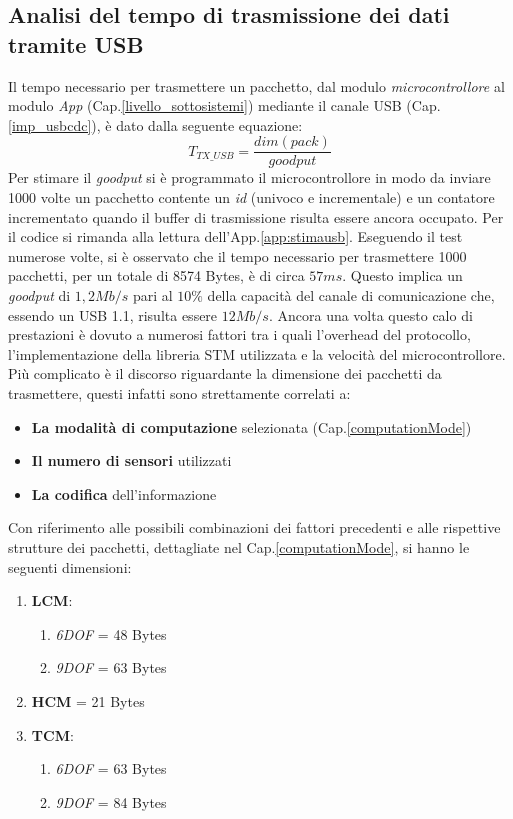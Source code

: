 \subsection{Analisi del tempo di trasmissione dei dati tramite USB}
\label{analisiusb}
Il tempo necessario per trasmettere un pacchetto, dal modulo \textit{microcontrollore} al modulo \textit{App} (Cap.\ref{livello_sottosistemi}) mediante il canale USB (Cap.\ref{imp_usbcdc}), è dato dalla seguente equazione:
\begin{equation}
\label{tx_usb}
T_{TX\_USB}=  \frac{dim(pack)}{goodput}
\end{equation}
Per stimare il \textit{goodput} si è programmato il microcontrollore in modo da inviare 1000 volte un pacchetto contente un \textit{id} (univoco e incrementale) e un contatore incrementato quando il buffer di trasmissione risulta essere ancora occupato. Per il codice si rimanda alla lettura dell'App.\ref{app:stimausb}.
Eseguendo il test numerose volte, si è osservato che il tempo necessario per trasmettere 1000 pacchetti, per un totale di 8574 Bytes, è di circa $57 ms$. 
Questo implica un \textit{goodput} di $1,2 Mb/s$ pari al $10\%$ della capacità del canale di comunicazione che, essendo un USB 1.1, risulta essere $12 Mb/s$. Ancora una volta questo calo di prestazioni è dovuto a numerosi fattori tra i quali l'overhead del protocollo, l'implementazione della libreria STM utilizzata e la velocità del microcontrollore.\\
Più complicato è il discorso riguardante la dimensione dei pacchetti da trasmettere, questi infatti sono strettamente correlati a:
 \begin{itemize}
 	\item \textbf{La modalità di computazione} selezionata (Cap.\ref{computationMode})
 	\item \textbf{Il numero di sensori} utilizzati
 	\item \textbf{La codifica} dell'informazione
  \end{itemize}

Con riferimento alle possibili combinazioni dei fattori precedenti e alle rispettive strutture dei pacchetti, dettagliate nel Cap.\ref{computationMode}, si hanno le seguenti dimensioni: 
\begin{enumerate}
	\item \textbf{LCM}:
		\begin{enumerate}
		\item \textit{6DOF} = 48 Bytes
		\item \textit{9DOF} = 63 Bytes
		\end{enumerate}
	\item \textbf{HCM} = 21 Bytes
	\item \textbf{TCM}:
			\begin{enumerate}
			\item \textit{6DOF} = 63 Bytes
			\item \textit{9DOF} = 84 Bytes
			\end{enumerate}
\end{enumerate}

